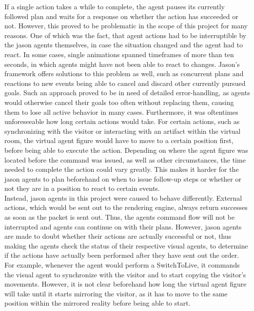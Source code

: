 \documentclass[draft,final]{vutinfth} %
\begin{document}
If a single action takes a while to complete, the agent pauses its currently followed plan and waits for a response on whether the action has succeeded or not. 
However, this proved to be problematic in the scope of this project for many reasons. 
One of which was the fact, that agent actions had to be interruptible by the \glspl{jason agent} themselves, in case the situation changed and the agent had to react. 
In some cases, single animations spanned timeframes of more than ten seconds, in which agents might have not been able to react to changes. 
Jason’s framework offers solutions to this problem as well, such as concurrent plans and reactions to new events being able to cancel and discard other currently pursued goals. 
Such an approach proved to be in need of detailed error-handling, as agents would otherwise cancel their goals too often without replacing them, causing them to lose all active behavior in many cases. 
Furthermore, it was oftentimes unforeseeable how long certain actions would take. 
For certain actions, such as synchronizing with the \gls{visitor} or interacting with an artifact within the virtual room, the virtual \gls{agent figure} would have to move to a certain position first, before being able to execute the action. 
Depending on where the \gls{agent figure} was located before the command was issued, as well as other circumstances, the time needed to complete the action could vary greatly. 
This makes it harder for the \glspl{jason agent} to plan beforehand on when to issue follow-up steps or whether or not they are in a position to react to certain events. \\
Instead, \glspl{jason agent} in this project were caused to behave differently. 
External actions, which would be sent out to the rendering engine, always return successes as soon as the packet is sent out. 
Thus, the agents command flow will not be interrupted and agents can continue on with their plans. 
However, \glspl{jason agent} are made to doubt whether their actions are actually successful or not, thus making the agents check the status of their respective visual agents, to determine if the actions have actually been performed after they have sent out the order. 
For example, whenever the agent would perform a SwitchToLive, it commands the visual agent to synchronize with the \gls{visitor} and to start copying the \gls{visitor}’s movements. 
However, it is not clear beforehand how long the virtual \gls{agent figure} will take until it starts mirroring the \gls{visitor}, as it has to move to the same position within the mirrored reality before being able to start. 
\end{document}
